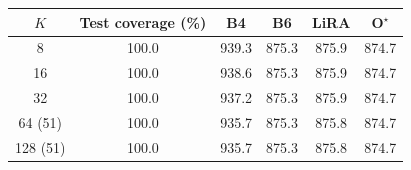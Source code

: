 \begin{tabular}{@{}cccccc@{}}
\toprule
$K$ & Test coverage (\%) & B4 & B6 & LiRA & O$^\star$ \\
\midrule
8 & 100.0 & 939.3 & 875.3 & 875.9 & 874.7 \\
16 & 100.0 & 938.6 & 875.3 & 875.9 & 874.7 \\
32 & 100.0 & 937.2 & 875.3 & 875.9 & 874.7 \\
64 (51) & 100.0 & 935.7 & 875.3 & 875.8 & 874.7 \\
128 (51) & 100.0 & 935.7 & 875.3 & 875.8 & 874.7 \\
\bottomrule
\end{tabular}
